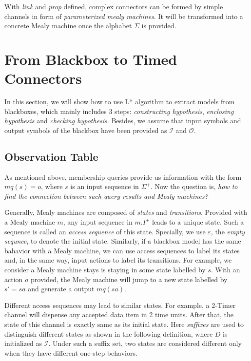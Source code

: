 \documentclass[conference, a4paper]{IEEEtran}
\begin{document}
With \emph{link} and \emph{prop} defined, complex connectors can be formed by simple channels in
form of \emph{parameterized mealy machines}. It will be transformed into a concrete Mealy machine
once the alphabet $\Sigma$ is provided.

\section{From Blackbox to Timed Connectors} 
\label{sec:activelearning}
In this section, we will show how to use L* algorithm to extract models from blackboxes, which
mainly includes 3 steps: \emph{constructing hypothesis}, \emph{enclosing hypothesis} and
\emph{checking hypothesis}. Besides, we assume that input symbols and output symbols of the blackbox
have been provided as $\mathcal{I}$ and $\mathcal{O}$.

\subsection{Observation Table}
As mentioned above, membership queries provide us information with the form $mq(s)=o$, where $s$ is
an input sequence in $\Sigma^{+}$. Now the question is, \emph{how to find the connection between
such query results and Mealy machines?}

Generally, Mealy machines are composed of \emph{states} and \emph{transitions}.
Provided with a Mealy machine $m$, any input sequence in $m.I^+$ leads to a unique state. 
Such a sequence is called an \emph{access sequence} of this state.
Specially, we use $\varepsilon$, the \emph{empty sequnce}, to denote the initial state.
Similarly, if a blackbox model has the same bahavior with a Mealy machine, we can use access
sequences to label its states and, in the same way, input actions to label its transitions.
For example, we consider a Mealy machine stays is staying in some state labelled by $s$. With an
action $a$ provided, the Mealy machine will jump to a new state labelled by $s'=sa$ and generate a
output $mq(sa)$. 

Different access sequences may lead to similar states. For example, a 2-Timer channel will dispense
any accepted data item in 2 time units. After that, the state of this channel is exactly same as its
initial state. Here \emph{suffixes} are used to distinguish different states as shown in the
following definition, where $D$ is initialized as $\mathcal{I}$. Under such a suffix set, two states
are considered different only when they have different one-step behaviors.
\end{document}
